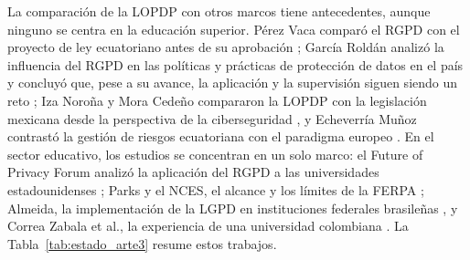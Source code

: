 La comparación de la LOPDP con otros marcos tiene antecedentes, aunque ninguno se centra en la educación superior. Pérez Vaca comparó el RGPD con el proyecto de ley ecuatoriano antes de su aprobación \cite{perezvaca2021}; García Roldán analizó la influencia del RGPD en las políticas y prácticas de protección de datos en el país y concluyó que, pese a su avance, la aplicación y la supervisión siguen siendo un reto \cite{garcia2024rgpd}; Iza Noroña y Mora Cedeño compararon la LOPDP con la legislación mexicana desde la perspectiva de la ciberseguridad \cite{iza2023lopdp}, y Echeverría Muñoz contrastó la gestión de riesgos ecuatoriana con el paradigma europeo \cite{echeverria2026riesgos}. En el sector educativo, los estudios se concentran en un solo marco: el Future of Privacy Forum analizó la aplicación del RGPD a las universidades estadounidenses \cite{fpf2020gdpr}; Parks y el NCES, el alcance y los límites de la FERPA \cite{parks2017ferpa,nces2004privacy}; Almeida, la implementación de la LGPD en instituciones federales brasileñas \cite{almeida2024lgpd}, y Correa Zabala et al., la experiencia de una universidad colombiana \cite{correa2024rosario}. La Tabla~\ref{tab:estado_arte3} resume estos trabajos.

